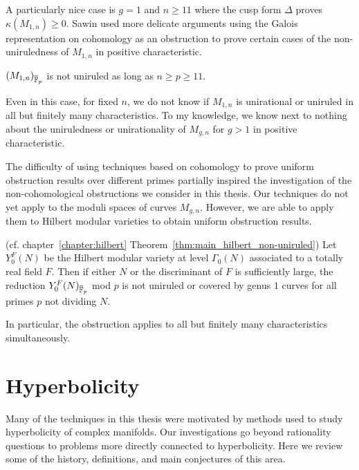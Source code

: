 \documentclass[main.tex]{subfiles}
\begin{document}
A particularly nice case is $g = 1$ and $n \ge 11$ where the cusp form $\Delta$ proves $\kappa(M_{1,n}) \ge 0$. Sawin used more delicate arguments using the Galois representation on \etale cohomology as an obstruction to prove certain cases of the non-uniruledness of $M_{1,n}$ in positive characteristic.

\begin{theorem}[Sawin, 2019] \cite{sawin:M1n_not_uniruled}
$(M_{1,n})_{\overline{\mathbb{F}}_p}$ is not uniruled as long as $n \ge p \ge 11$.
\end{theorem}

Even in this case, for fixed $n$, we do not know if $M_{1,n}$ is unirational or uniruled in all but finitely many characteristics. To my knowledge, we know next to nothing about the uniruledness or unirationality of $M_{g,n}$ for $g > 1$ in positive characteristic. 
\par 
The difficulty of using techniques based on \etale cohomology to prove uniform obstruction results over different primes partially inspired the investigation of the non-cohomological obstructions we consider in this thesis. Our techniques do not yet apply to the moduli spaces of curves $M_{g,n}$. However, we are able to apply them to Hilbert modular varieties to obtain uniform obstruction results.

\begin{theorem} (cf. chapter~\ref{chapter:hilbert} Theorem~\ref{thm:main_hilbert_non-uniruled})
Let $Y_0^F(N)$ be the Hilbert modular variety at level $\Gamma_0(N)$ associated to a totally real field $F$. Then if either $N$ or the discriminant of $F$ is sufficiently large, the reduction $Y_0^F(N)_{\overline{\mathbb{F}}_p}$ mod $p$ is not uniruled or covered by genus $1$ curves for all primes $p$ not dividing $N$.
\end{theorem}

In particular, the obstruction applies to all but finitely many characteristics simultaneously. 

\section{Hyperbolicity}

Many of the techniques in this thesis were motivated by methods used to study hyperbolicity of complex manifolds. Our investigations go beyond rationality questions to problems more directly connected to hyperbolicity. Here we review some of the history, definitions, and main conjectures of this area.
\end{document}
